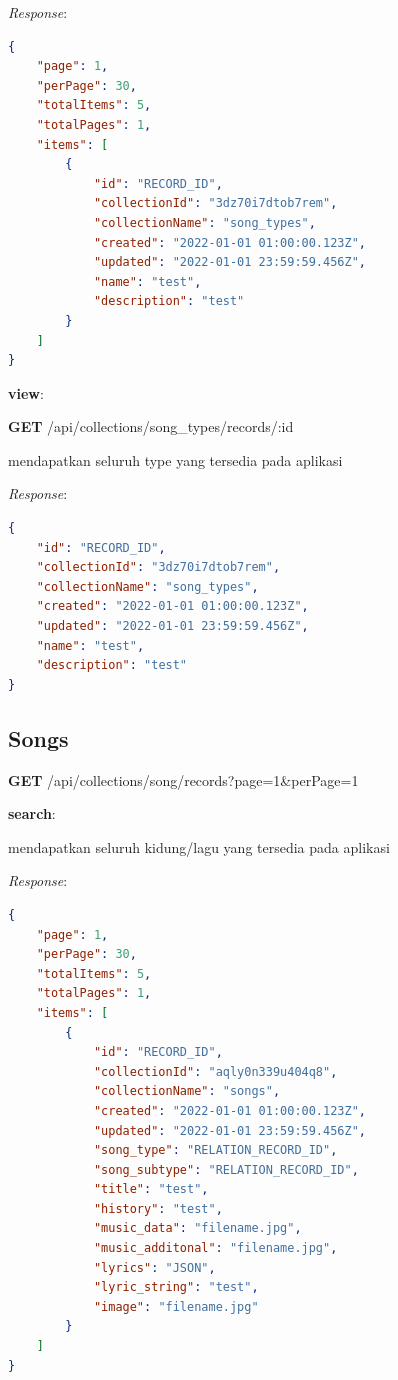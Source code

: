 \documentclass[a4paper, 12pt]{article}
\begin{document}
\textit{Response}:
\begin{lstlisting}[language=json,firstnumber=1]
{
    "page": 1,
    "perPage": 30,
    "totalItems": 5,
    "totalPages": 1,
    "items": [
        {
            "id": "RECORD_ID",
            "collectionId": "3dz70i7dtob7rem",
            "collectionName": "song_types",
            "created": "2022-01-01 01:00:00.123Z",
            "updated": "2022-01-01 23:59:59.456Z",
            "name": "test",
            "description": "test"
        }
    ]
}

\end{lstlisting}

\textbf{view}:

\textbf{GET} /api/collections/song\_types/records/:id

\indent mendapatkan seluruh type yang tersedia pada aplikasi

\textit{Response}:
\begin{lstlisting}[language=json,firstnumber=1]
{
    "id": "RECORD_ID",
    "collectionId": "3dz70i7dtob7rem",
    "collectionName": "song_types",
    "created": "2022-01-01 01:00:00.123Z",
    "updated": "2022-01-01 23:59:59.456Z",
    "name": "test",
    "description": "test"
}
\end{lstlisting}

\subsection*{Songs}
\textbf{GET} /api/collections/song/records?page=1\&perPage=1

\textbf{search}:

\indent mendapatkan seluruh kidung/lagu yang tersedia pada aplikasi

\textit{Response}:
\begin{lstlisting}[language=json,firstnumber=1]
{
    "page": 1,
    "perPage": 30,
    "totalItems": 5,
    "totalPages": 1,
    "items": [
        {
            "id": "RECORD_ID",
            "collectionId": "aqly0n339u404q8",
            "collectionName": "songs",
            "created": "2022-01-01 01:00:00.123Z",
            "updated": "2022-01-01 23:59:59.456Z",
            "song_type": "RELATION_RECORD_ID",
            "song_subtype": "RELATION_RECORD_ID",
            "title": "test",
            "history": "test",
            "music_data": "filename.jpg",
            "music_additonal": "filename.jpg",
            "lyrics": "JSON",
            "lyric_string": "test",
            "image": "filename.jpg"
        }    
    ]
}
\end{lstlisting}
\end{document}
